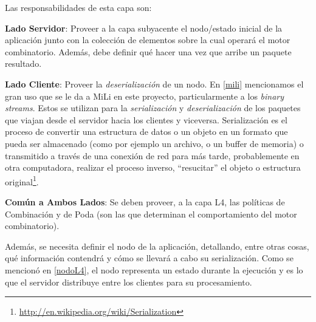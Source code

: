 			Las responsabilidades de esta capa son:
			\begin{description}
				\item \textbf{Lado Servidor}: Proveer a la capa subyacente el nodo/estado inicial de la aplicaci\'on junto con la colecci\'on de elementos
				sobre la cual operar\'a el motor combinatorio. Adem\'as, debe definir qu\'e hacer una vez que arribe 
				un paquete resultado.

				\item \textbf{Lado Cliente}: Proveer la \textit{deserializaci\'on} de un nodo. En \ref{mili} mencionamos el gran uso que se le da a 
				MiLi en este proyecto, par\-ti\-cu\-lar\-men\-te a los \textit{binary streams}. Estos se utilizan para la \textit{se\-ria\-li\-za\-ci\'on} 
				y \textit{deserializaci\'on} de los paquetes que viajan desde el servidor hacia los clientes y viceversa. Serializaci\'on es el proceso de 
				convertir una estructura de datos o un objeto en un formato que pueda ser almacenado (como por ejemplo un archivo, o un buffer de memoria) o 
				transmitido a trav\'es de una conexi\'on de red para m\'as tarde, probablemente en otra computadora, realizar el proceso inverso, ``resucitar'' el 
        objeto o estructura original\footnote{\url{http://en.wikipedia.org/wiki/Serialization}}.
				\item \textbf{Com\'un a Ambos Lados}: Se deben proveer, a la capa L4, las pol\'iticas de Combinaci\'on y de Poda (son las que determinan el 
				comportamiento del motor combinatorio).
				
				Adem\'as, se necesita definir el nodo de la aplicaci\'on, detallando, entre otras cosas, qu\'e informaci\'on contendr\'a y c\'omo se llevar\'a a cabo su serializaci\'on. 
				Como se mencion\'o en \ref{nodoL4}, el nodo representa un estado durante la ejecuci\'on y es lo que el servidor distribuye entre los clientes para 
				su procesamiento.
			\end{description}

